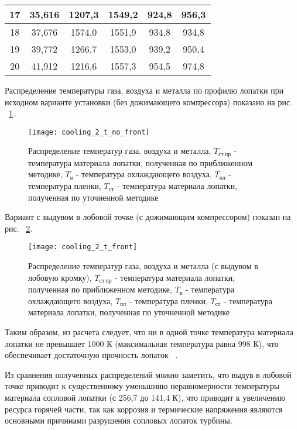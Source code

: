 \begin{enumerate}
\begin{longtable}{|c|c|c|c|c|c|}
			17 & 
			35,616 & 
			1207,3 & 
			1549,2 &
			924,8 & 
			956,3  
			\\\hline
		
			18 & 
			37,676 & 
			1574,0 & 
			1551,9 &
			934,8 & 
			934,8  
			\\\hline
		
			19 & 
			39,772 & 
			1266,7 & 
			1553,0 &
			939,2 & 
			950,4  
			\\\hline
		
			20 & 
			41,912 & 
			1216,6 & 
			1557,3 &
			954,5 & 
			974,8  
			\\\hline
			
		\end{longtable}

\end{enumerate}

Распределение температуры газа, воздуха и металла по профилю лопатки при исходном варианте установки
(без дожимающего компрессора) показано на рис. ~\ref{img:cool_gas_parameters_no_front}.
\begin{figure}[H]
    \centering
	\texttt{[image: cooling\_2\_t\_no\_front]}
	\caption{Распределение температур газа, воздуха и металла, $T_{ст \ пр}$ - температура материала лопатки, полученная
	по приближенном методике, $T_в$ - температура охлаждающего воздуха, $T_{пл}$ - температура пленки, $T_{ст}$ -
	температура материала лопатки, полученная по уточненной методике}
	\label{img:cool_gas_parameters_no_front}
\end{figure}

Вариант с выдувом в лобовой точке (с дожимающим компрессором) показан на рис. ~\ref{img:cool_gas_parameters_front}.
\begin{figure}[H]
    \centering
	\texttt{[image: cooling\_2\_t\_front]}
	\caption{Распределение температур газа, воздуха и металла (с выдувом в лобовую кромку), $T_{ст \ пр}$ - температура материала лопатки, полученная
	по приближенном методике, $T_в$ - температура охлаждающего воздуха, $T_{пл}$ - температура пленки, $T_{ст}$ -
	температура материала лопатки, полученная по уточненной методике}
	\label{img:cool_gas_parameters_front}
\end{figure}

Таким образом, из расчета следует, что ни в одной точке температура материала лопатки не превышает 1000 К (максимальная температура
равна 998 К), что обеспечивает достаточную прочность лопаток
~\cite{js_36_properties}.

Из сравнения полученных распределений можно заметить, что выдув в лобовой точке приводит к существенному уменьшнию
неравномерности температуры материала сопловой лопатки (с 256,7 до 141,4 К), что приводит к увеличению ресурса горячей
части, так как коррозия и термические напряжения являются основными причинами разрушения сопловых лопаток турбины.